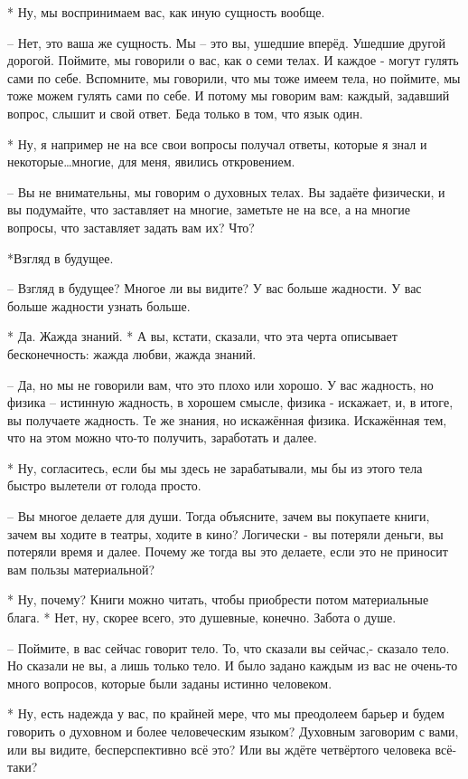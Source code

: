  * Ну, мы воспринимаем вас, как иную сущность вообще.

 – Нет, это ваша же сущность. Мы – это вы, ушедшие вперёд. Ушедшие другой дорогой. Поймите, мы говорили о вас, как о семи телах. И каждое - могут гулять сами по себе. Вспомните, мы говорили, что мы тоже имеем тела, но поймите, мы тоже можем гулять сами по себе. И потому мы говорим вам: каждый, задавший вопрос, слышит и свой ответ. Беда только в том, что язык один.

 * Ну, я например не на все свои вопросы получал ответы, которые я знал и некоторые…многие, для меня, явились  откровением.

 – Вы не внимательны, мы говорим о духовных телах. Вы задаёте физически, и вы подумайте, что заставляет на многие, заметьте не на все, а на многие вопросы, что заставляет задать вам их? Что?

 *Взгляд в будущее.

 – Взгляд в будущее? Многое ли вы видите? У вас больше жадности. У вас больше жадности узнать больше.

 * Да. Жажда знаний.
 * А вы, кстати, сказали, что эта черта описывает бесконечность: жажда любви, жажда знаний.

 – Да, но мы не говорили вам, что это плохо или хорошо. У вас жадность, но физика – истинную  жадность, в хорошем смысле, физика - искажает, и, в итоге, вы получаете жадность. Те же знания, но искажённая физика. Искажённая тем, что на этом можно что-то получить, заработать и далее.

 * Ну, согласитесь, если бы мы здесь не зарабатывали, мы бы из этого тела быстро вылетели от голода просто.

 – Вы многое делаете для души. Тогда объясните, зачем вы покупаете книги, зачем вы ходите в театры, ходите в кино? Логически - вы потеряли деньги, вы потеряли время и далее. Почему же тогда вы это делаете, если это не приносит вам пользы материальной?

 * Ну, почему? Книги можно читать, чтобы приобрести потом материальные блага.
 * Нет, ну, скорее всего, это душевные, конечно. Забота о душе.

 – Поймите, в вас сейчас говорит тело. То, что сказали вы сейчас,- сказало тело. Но сказали не вы, а лишь только тело. И было задано каждым из вас не очень-то много вопросов, которые были заданы истинно человеком.

 * Ну, есть надежда у вас, по крайней мере, что мы преодолеем барьер и будем говорить о духовном и более человеческим языком? Духовным заговорим с вами, или вы видите, бесперспективно всё это? Или вы ждёте четвёртого человека всё-таки?

